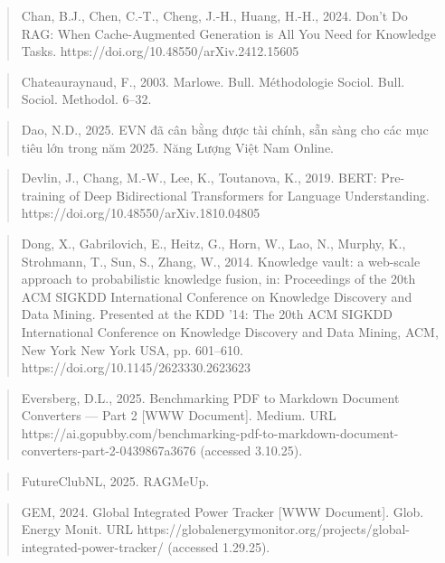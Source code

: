 \documentclass[a4paper,11pt]{report}
\begin{document}
\begin{quote}
Chan, B.J., Chen, C.-T., Cheng, J.-H., Huang, H.-H., 2024. Don't Do RAG: When Cache-Augmented Generation is All You Need for Knowledge Tasks. https://doi.org/10.48550/arXiv.2412.15605
\end{quote}

\begin{quote}
Chateauraynaud, F., 2003. Marlowe. Bull. Méthodologie Sociol. Bull. Sociol. Methodol. 6--32.
\end{quote}

\begin{quote}
Dao, N.D., 2025. EVN đã cân bằng được tài chính, sẵn sàng cho các mục tiêu lớn trong năm 2025. Năng Lượng Việt Nam Online.
\end{quote}

\begin{quote}
Devlin, J., Chang, M.-W., Lee, K., Toutanova, K., 2019. BERT: Pre-training of Deep Bidirectional Transformers for Language Understanding. https://doi.org/10.48550/arXiv.1810.04805
\end{quote}

\begin{quote}
Dong, X., Gabrilovich, E., Heitz, G., Horn, W., Lao, N., Murphy, K., Strohmann, T., Sun, S., Zhang, W., 2014. Knowledge vault: a web-scale approach to probabilistic knowledge fusion, in: Proceedings of the 20th ACM SIGKDD International Conference on Knowledge Discovery and Data Mining. Presented at the KDD '14: The 20th ACM SIGKDD International Conference on Knowledge Discovery and Data Mining, ACM, New York New York USA, pp. 601--610. https://doi.org/10.1145/2623330.2623623
\end{quote}

\begin{quote}
Eversberg, D.L., 2025. Benchmarking PDF to Markdown Document Converters --- Part 2 {[}WWW Document{]}. Medium. URL https://ai.gopubby.com/benchmarking-pdf-to-markdown-document-converters-part-2-0439867a3676 (accessed 3.10.25).
\end{quote}

\begin{quote}
FutureClubNL, 2025. RAGMeUp.
\end{quote}

\begin{quote}
GEM, 2024. Global Integrated Power Tracker {[}WWW Document{]}. Glob. Energy Monit. URL https://globalenergymonitor.org/projects/global-integrated-power-tracker/ (accessed 1.29.25).
\end{quote}
\end{document}
